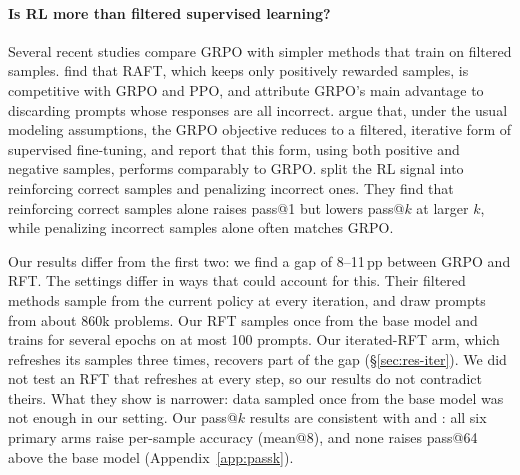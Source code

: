 \documentclass{article}
\begin{document}
\paragraph{Is RL more than filtered supervised learning?} Several recent studies compare GRPO with simpler methods that train on filtered samples. \citet{xiong2025minimalist} find that RAFT, which keeps only positively rewarded samples, is competitive with GRPO and PPO, and attribute GRPO's main advantage to discarding prompts whose responses are all incorrect. \citet{samineni2025rl} argue that, under the usual modeling assumptions, the GRPO objective reduces to a filtered, iterative form of supervised fine-tuning, and report that this form, using both positive and negative samples, performs comparably to GRPO. \citet{zhu2025surprising} split the RL signal into reinforcing correct samples and penalizing incorrect ones. They find that reinforcing correct samples alone raises pass@1 but lowers pass@$k$ at larger $k$, while penalizing incorrect samples alone often matches GRPO.

Our results differ from the first two: we find a gap of 8--11\,pp between GRPO and RFT. The settings differ in ways that could account for this. Their filtered methods sample from the current policy at every iteration, and \citet{xiong2025minimalist} draw prompts from about 860k problems. Our RFT samples once from the base model and trains for several epochs on at most 100 prompts. Our iterated-RFT arm, which refreshes its samples three times, recovers part of the gap (\S\ref{sec:res-iter}). We did not test an RFT that refreshes at every step, so our results do not contradict theirs. What they show is narrower: data sampled once from the base model was not enough in our setting. Our pass@$k$ results are consistent with \citet{zhu2025surprising} and \citet{yue2025does}: all six primary arms raise per-sample accuracy (mean@8), and none raises pass@64 above the base model (Appendix~\ref{app:passk}).
\end{document}
